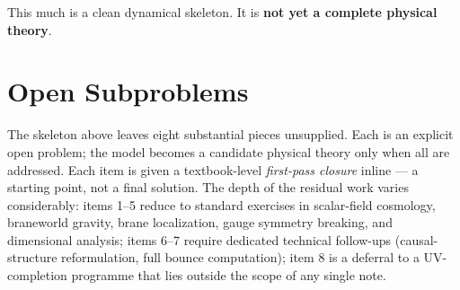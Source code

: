 \documentclass[11pt,a4paper]{article}
\begin{document}
This much is a clean dynamical skeleton. It is \textbf{not yet a complete physical theory}.

\section{Open Subproblems}
\label{sec:open}

The skeleton above leaves eight substantial pieces unsupplied. Each is an explicit open problem; the model becomes a candidate physical theory only when all are addressed. Each item is given a textbook-level \emph{first-pass closure} inline --- a starting point, not a final solution. The depth of the residual work varies considerably: items 1--5 reduce to standard exercises in scalar-field cosmology, braneworld gravity, brane localization, gauge symmetry breaking, and dimensional analysis; items 6--7 require dedicated technical follow-ups (causal-structure reformulation, full bounce computation); item 8 is a deferral to a UV-completion programme that lies outside the scope of any single note.
\end{document}
